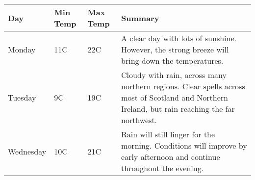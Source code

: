     
    
    
    
\begin{tabular}{ | l | l | l | p{5cm} |}
   \hline
   Day & Min Temp & Max Temp & Summary \\ \hline
   Monday & 11C & 22C & A clear day with lots of sunshine.  
   However, the strong breeze will bring down the temperatures. \\ \hline
   Tuesday & 9C & 19C & Cloudy with rain, across many northern regions. Clear spells 
   across most of Scotland and Northern Ireland, 
   but rain reaching the far northwest. \\ \hline
   Wednesday & 10C & 21C & Rain will still linger for the morning. 
   Conditions will improve by early afternoon and continue 
   throughout the evening. \\
   \hline
   \end{tabular}
    
    
